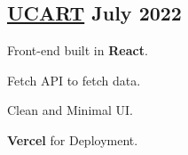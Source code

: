 \subsection{{\href{https://cart-topaz.vercel.app/}{UCART} \hfill July 2022}}
\begin{zitemize}
\item Front-end built in \textbf{React}.
\item Fetch API to fetch data.
\item Clean and Minimal UI.
\item \textbf{Vercel} for Deployment.
\end{zitemize}


